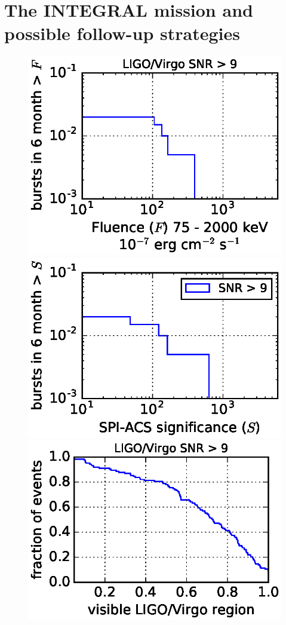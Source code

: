 \documentclass[11pt]{article}
\begin{document}
\section*{The INTEGRAL mission and possible follow-up strategies}

\begin{figure}
  \centering
    \includegraphics[scale=.6]{P7-1_f1.eps}
    \includegraphics[scale=.6]{P7-1_f2.eps}\\
    \includegraphics[scale=.5]{P7-1_f3.eps}

\end{figure}
\end{document}
